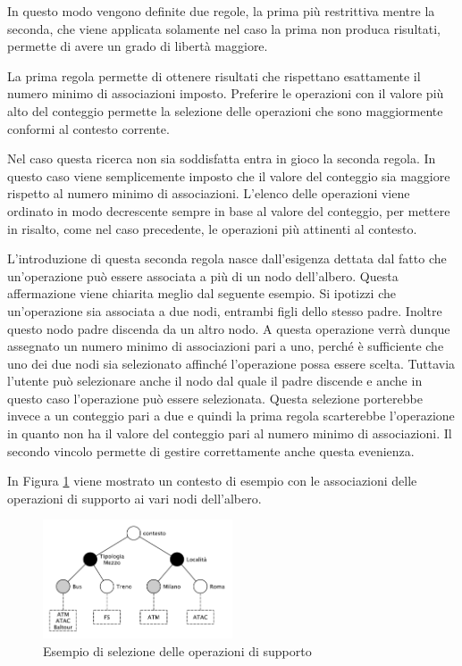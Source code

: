 In questo modo vengono definite due regole, la prima più restrittiva mentre la seconda, che viene applicata solamente nel caso la prima non produca risultati, permette di avere un grado di libertà maggiore.

La prima regola permette di ottenere risultati che rispettano esattamente il numero minimo di associazioni imposto. Preferire le operazioni con il valore più alto del conteggio permette la selezione delle operazioni che sono maggiormente conformi al contesto corrente.

Nel caso questa ricerca non sia soddisfatta entra in gioco la seconda regola. In questo caso viene semplicemente imposto che il valore del conteggio sia maggiore rispetto al numero minimo di associazioni. L'elenco delle operazioni viene ordinato in modo decrescente sempre in base al valore del conteggio, per mettere in risalto, come nel caso precedente, le operazioni più attinenti al contesto.

L'introduzione di questa seconda regola nasce dall'esigenza dettata dal fatto che un'operazione può essere associata a più di un nodo dell'albero. Questa affermazione viene chiarita meglio dal seguente esempio. Si ipotizzi che un'operazione sia associata a due nodi, entrambi figli dello stesso padre. Inoltre questo nodo padre discenda da un altro nodo. A questa operazione verrà dunque assegnato un numero minimo di associazioni pari a uno, perché è sufficiente che uno dei due nodi sia selezionato affinché l'operazione possa essere scelta. Tuttavia l'utente può selezionare anche il nodo dal quale il padre discende e anche in questo caso l'operazione può essere selezionata. Questa selezione porterebbe invece a un conteggio pari a due e quindi la prima regola scarterebbe l'operazione in quanto non ha il valore del conteggio pari al numero minimo di associazioni. Il secondo vincolo permette di gestire correttamente anche questa evenienza.

In Figura \ref{fig:esempio-selezione-supporto} viene mostrato un contesto di esempio con le associazioni delle operazioni di supporto ai vari nodi dell'albero.

\begin{figure}[ht]
	\centering
	\includegraphics[width=0.5\textwidth]{3-metodologia-camus/Immagini/esempio-selezione-supporto.pdf}
	\caption{Esempio di selezione delle operazioni di supporto}\label{fig:esempio-selezione-supporto}
\end{figure}

